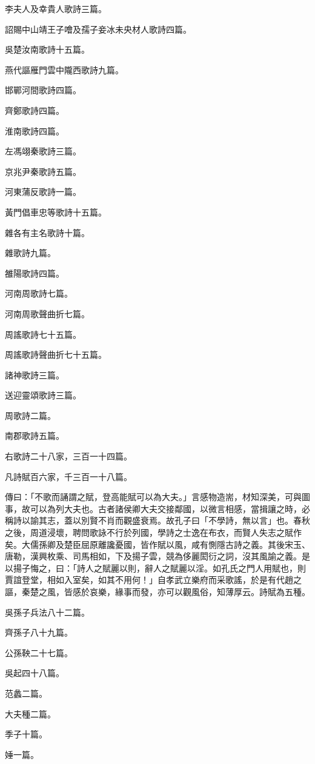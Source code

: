 \begin{pinyinscope}
李夫人及幸貴人歌詩三篇。

詔賜中山靖王子噲及孺子妾冰未央材人歌詩四篇。

吳楚汝南歌詩十五篇。

燕代謳雁門雲中隴西歌詩九篇。

邯鄲河間歌詩四篇。

齊鄭歌詩四篇。

淮南歌詩四篇。

左馮翊秦歌詩三篇。

京兆尹秦歌詩五篇。

河東蒲反歌詩一篇。

黃門倡車忠等歌詩十五篇。

雜各有主名歌詩十篇。

雜歌詩九篇。

雒陽歌詩四篇。

河南周歌詩七篇。

河南周歌聲曲折七篇。

周謠歌詩七十五篇。

周謠歌詩聲曲折七十五篇。

諸神歌詩三篇。

送迎靈頌歌詩三篇。

周歌詩二篇。

南郡歌詩五篇。

右歌詩二十八家，三百一十四篇。

凡詩賦百六家，千三百一十八篇。

傳曰：「不歌而誦謂之賦，登高能賦可以為大夫。」言感物造耑，材知深美，可與圖事，故可以為列大夫也。古者諸侯卿大夫交接鄰國，以微言相感，當揖讓之時，必稱詩以諭其志，蓋以別賢不肖而觀盛衰焉。故孔子曰「不學詩，無以言」也。春秋之後，周道浸壞，聘問歌詠不行於列國，學詩之士逸在布衣，而賢人失志之賦作矣。大儒孫卿及楚臣屈原離讒憂國，皆作賦以風，咸有惻隱古詩之義。其後宋玉、唐勒，漢興枚乘、司馬相如，下及揚子雲，競為侈麗閎衍之詞，沒其風諭之義。是以揚子悔之，曰：「詩人之賦麗以則，辭人之賦麗以淫。如孔氏之門人用賦也，則賈誼登堂，相如入室矣，如其不用何！」自孝武立樂府而采歌謠，於是有代趙之謳，秦楚之風，皆感於哀樂，緣事而發，亦可以觀風俗，知薄厚云。詩賦為五種。

吳孫子兵法八十二篇。

齊孫子八十九篇。

公孫鞅二十七篇。

吳起四十八篇。

范蠡二篇。

大夫種二篇。

季子十篇。

娷一篇。


\end{pinyinscope}
